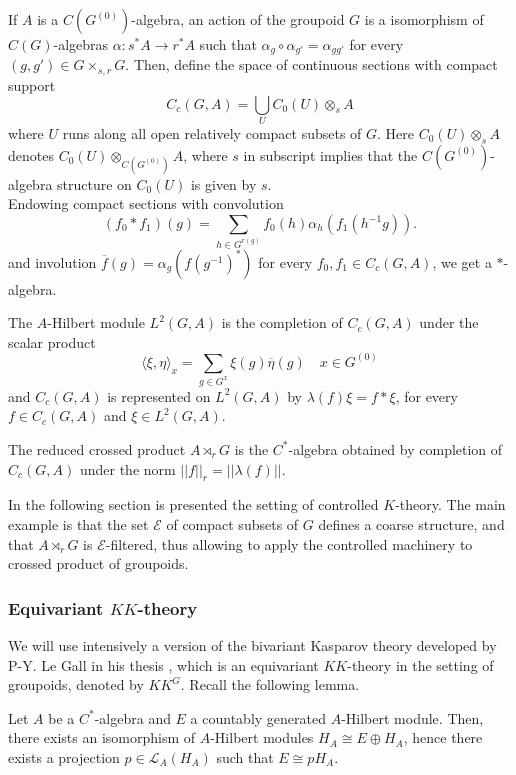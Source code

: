 If $A$ is a $C(G^{(0)})$-algebra, an action of the groupoid $G$ is a isomorphism of $C(G)$-algebras $\alpha : s^* A \rightarrow r^* A$ such that $\alpha_g \circ \alpha_{g'} = \alpha_{gg'}$ for every $(g,g')\in G\times_{s,r} G$. Then, define the space of continuous sections with compact support 
\[C_c(G,A) = \bigcup_{U} C_0(U)\otimes_s A\]
where $U$ runs along all open relatively compact subsets of $G$. Here $C_0(U)\otimes_s A$ denotes $C_0(U)\otimes_{C(G^{(0)})} A$, where $s$ in subscript implies that the $C(G^{(0)})$-algebra structure on $C_0(U)$ is given by $s$.\\

Endowing compact sections with convolution
\[(f_0\ast f_1)(g) = \sum_{h\in G^{r(g)}} f_0(h) \alpha_h(f_1(h^{-1}g)).\]
and involution $\overline f(g)=\alpha_g(f(g^{-1})^*)$ for every $f_0,f_1\in C_c(G,A)$, we get a $*$-algebra. 

The $A$-Hilbert module $L^2(G,A)$ is the completion of $C_c(G,A)$ under the scalar product 
\[\langle \xi ,\eta \rangle_x  = \sum_{g\in G^x} \xi(g)\overline \eta(g) \quad x\in G^{(0)} \]
and $C_c(G,A)$ is represented on $L^2(G,A)$ by $\lambda(f) \xi = f\ast \xi$, for every $ f\in C_c(G,A)$ and $\xi\in L^2(G,A)$.\\

\begin{definition}
The reduced crossed product $A\rtimes_r G$ is the $C^*$-algebra obtained by completion of $C_c(G,A)$ under the norm $||f||_r=||\lambda(f)||$.
\end{definition}

In the following section is presented the setting of controlled $K$-theory. The main example is that the set $\mathcal E$ of compact subsets of $G$ defines a coarse structure, and that $A\rtimes_r G$ is $\mathcal E$-filtered, thus allowing to apply the controlled machinery to crossed product of groupoids. \\

\subsubsection{Equivariant $KK$-theory}

We will use intensively a version of the bivariant Kasparov theory developed by P-Y. Le Gall in his thesis \cite{LeGall}, which is an equivariant $KK$-theory in the setting of groupoids, denoted by $KK^G$. Recall the following lemma.

\begin{lem}
Let $A$ be a $C^*$-algebra and $E$ a countably generated $A$-Hilbert module. Then, there exists an isomorphism of $A$-Hilbert modules $H_A \cong E\oplus H_A$, hence there exists a projection $p\in \mathcal L_A(H_A)$ such that $E\cong p H_A$. 
\end{lem}


